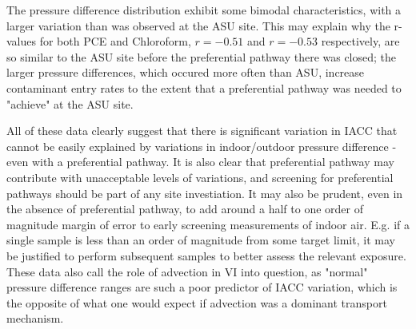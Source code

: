 \documentclass[journal=esthag,manuscript=article]{achemso}
\begin{document}
The pressure difference distribution exhibit some bimodal characteristics, with a larger variation than was observed at the ASU site.
This may explain why the r-values for both PCE and Chloroform, $r=-0.51$ and $r=-0.53$ respectively, are so similar to the ASU site before the preferential pathway there was closed; the larger pressure differences, which occured more often than ASU, increase contaminant entry rates to the extent that a preferential pathway was needed to "achieve" at the ASU site.\par
All of these data clearly suggest that there is significant variation in IACC that cannot be easily explained by variations in indoor/outdoor pressure difference - even with a preferential pathway.
It is also clear that preferential pathway may contribute with unacceptable levels of variations, and screening for preferential pathways should be part of any site investiation.
It may also be prudent, even in the absence of preferential pathway, to add around a half to one order of magnitude margin of error to early screening measurements of indoor air.
E.g. if a single sample is less than an order of magnitude from some target limit, it may be justified to perform subsequent samples to better assess the relevant exposure.
These data also call the role of advection in VI into question, as "normal" pressure difference ranges are such a poor predictor of IACC variation, which is the opposite of what one would expect if advection was a dominant transport mechanism.\par
\end{document}
